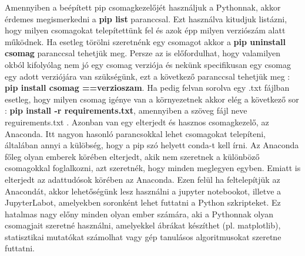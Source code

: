 \documentclass{article}
\theoremstyle{definition}
\theoremstyle{theorem}
\begin{document}

Amennyiben a beépített pip csomagkezelőjét használjuk a Pythonnak, akkor érdemes megismerkedni a \textbf{pip list} paranccsal. Ezt használva kitudjuk listázni, hogy milyen csomagokat telepítettünk fel és azok épp milyen verziószám alatt működnek. \newline
Ha esetleg törölni szeretnénk egy csomagot akkor a \textbf{pip uninstall csomag} paranccsal tehetjük meg. Persze az is előfordulhat, hogy valamilyen okból kifolyólag nem jó egy csomag verziója és nekünk specifikusan egy csomag egy adott verziójára van szükségünk, ezt a következő paranccsal tehetjük meg : \textbf{pip install csomag ==verzioszam}. Ha pedig felvan sorolva egy .txt fájlban esetleg, hogy milyen csomag igénye van a környezetnek akkor elég a következő sor : \textbf{pip install -r requirements.txt}, amennyiben a szöveg fájl neve reguirements.txt . \newline
Azonban van egy elterjedt és hasznos csomagkezelő, az Anaconda. Itt nagyon hasonló parancsokkal lehet csomagokat telepíteni, általában\cite{Anaconda} annyi a külöbség, hogy a pip szó helyett conda-t kell írni. Az Anaconda főleg olyan emberek körében elterjedt, akik nem szeretnek a különböző csomagokkal foglalkozni, azt szeretnék, hogy minden meglegyen egyben. Emiatt is elterjedt az adattudósok körében az Anaconda. Ezen felül ha feltelepítjük az Anacondát, akkor lehetőségünk lesz használni a jupyter notebookot, illetve a JupyterLabot, amelyekben soronként lehet futtatni a Python szkripteket. Ez hatalmas nagy előny minden olyan ember számára, aki a Pythonnak olyan csomagjait szeretné használni, amelyekkel ábrákat készíthet (pl. matplotlib), statisztikai mutatókat számolhat vagy gép tanulásos algoritmusokat szeretne futtatni.
\end{document}
